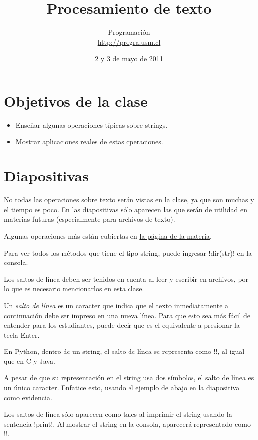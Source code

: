 \documentclass[10pt]{article}
\title{Procesamiento de texto}
\author{Programación \\ \url{http://progra.usm.cl}}
\date{2 y 3 de mayo de 2011}
\begin{document}
  \maketitle

  \section*{Objetivos de la clase}
  \begin{itemize}
    \item Enseñar algunas operaciones típicas
      sobre strings.
    \item Mostrar aplicaciones reales de estas operaciones.
  \end{itemize}

  \section*{Diapositivas}

  No todas las operaciones sobre texto
  serán vistas en la clase,
  ya que son muchas y el tiempo es poco.
  En las diapositivas sólo aparecen
  las que serán de utilidad en materias futuras
  (especialmente para archivos de texto).

  Algunas operaciones más
  están cubiertas en \href{http://progra.usm.cl/materia/texto.html}{la página de la materia}.

  Para ver todos los métodos que tiene el tipo string,
  puede ingresar \li!dir(str)! en la consola.


  Los saltos de línea deben ser tenidos en cuenta
  al leer y escribir en archivos,
  por lo que es necesario mencionarlos en esta clase.

  Un \emph{salto de línea}
  es un caracter que indica que el texto inmediatamente a continuación
  debe ser impreso en una nueva línea.
  Para que esto sea más fácil de entender para los estudiantes,
  puede decir que es el equivalente a presionar la tecla Enter.

  En Python, dentro de un string, el salto de línea se representa
  como \li!\n!, al igual que en C y Java.

  A pesar de que su representación en el string usa dos símbolos,
  el salto de línea es un único caracter.
  Enfatice esto,
  usando el ejemplo de abajo en la diapositiva como evidencia.

  Los saltos de línea sólo aparecen como tales
  al imprimir el string usando la sentencia \li!print!.
  Al mostrar el string en la consola,
  aparecerá representado como \li!\n!.
\end{document}

